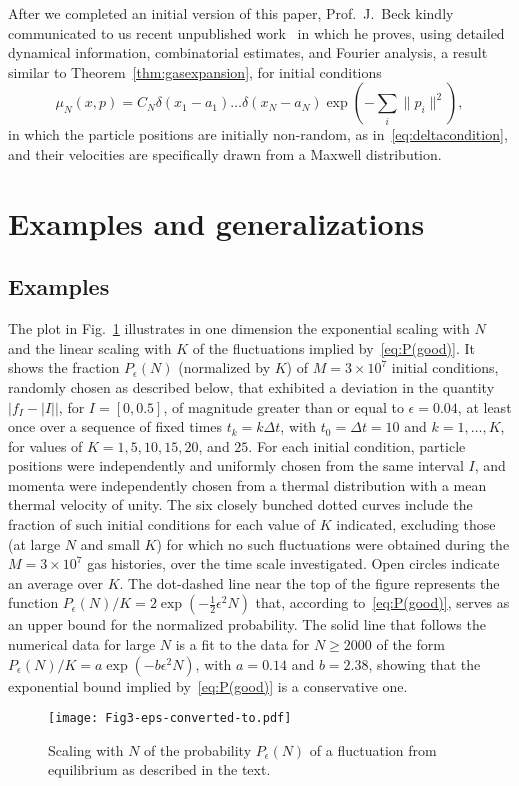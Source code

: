\documentclass{article}
\numberwithin{equation}{section}
\begin{document}
After we completed an initial version of this paper, Prof.~J.~Beck kindly communicated to us recent unpublished work~\cite{Be17} in which he proves, using detailed dynamical information, combinatorial estimates, and Fourier analysis,  a result similar to Theorem~\ref{thm:gasexpansion}, for initial conditions
$$
\mu_N(x,p)=C_{N}\delta(x_1-a_1)\dots \delta(x_N-a_N)\exp(-\sum_i \|p_i\|^2),
$$
in which the particle positions are initially non-random, as in~\eqref{eq:deltacondition}, and their velocities are specifically drawn from a Maxwell distribution.

\section{Examples and generalizations }\label{s:examples}
\subsection{Examples}
The plot in Fig.~\ref{fig:Fig3} illustrates in one dimension the exponential scaling with $N$ and the linear scaling with $K$ of the fluctuations implied by~\eqref{eq:P(good)}.
It shows the fraction $P_\epsilon(N)$ (normalized by $K$) of $M = 3\times 10^7$ initial conditions, randomly chosen as described below, that exhibited a deviation in the
quantity $|f_I - |I||$, for $I = [0,0.5]$, of magnitude greater than or equal to $\epsilon = 0.04$, at least once over a sequence of fixed times $t_k = k\Delta t$, with $t_0 = \Delta t = 10$ and $k = 1,\dots ,K$, for values of $K=1,5,10,15,20$, and $25$.  For each initial condition, particle positions were independently and uniformly chosen from the same interval $I$, and momenta were independently chosen from
a thermal distribution with a mean thermal velocity of unity. The six closely bunched dotted curves include the fraction of such initial conditions for each value of $K$ indicated, excluding those (at large $N$ and small $K$) for which no such fluctuations were obtained during the $M = 3\times 10^7$ gas histories, over the time scale investigated. Open circles indicate an average over $K$. The dot-dashed line near the top of the figure represents the function $P_\epsilon(N) /K = 2\exp(-\frac12\epsilon^2N)$ that, according to~\eqref{eq:P(good)}, serves as an upper bound for the normalized probability.  The solid line that follows the numerical data for large $N$ is a fit to the data for $N\geq 2000$ of the form $P_{\epsilon}(N)/K = a \exp(-b\epsilon^2 N)$, with $a=0.14$ and $b=2.38$, showing that the exponential bound implied by~\eqref{eq:P(good)} is a conservative one.
\begin{figure}
\texttt{[image: Fig3-eps-converted-to.pdf]}
\captionsetup{width=0.85\textwidth}
\centering
\caption{Scaling with $N$ of the probability $P_\epsilon(N)$ of a fluctuation from equilibrium as described in the text.}
\label{fig:Fig3}
\end{figure}
\end{document}
